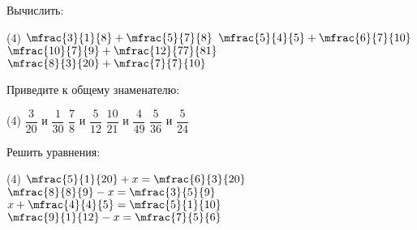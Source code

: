 %
%
%
%
%
%
%
%
\begin{class}[number=6]
	\begin{listofex}
		\item Вычислить:
		\begin{tasks}(4)
			\task \( \mfrac{3}{1}{8}+\mfrac{5}{7}{8} \)
			\task \( \mfrac{5}{4}{5}+\mfrac{6}{7}{10} \)
			\task \( \mfrac{10}{7}{9}+\mfrac{12}{77}{81} \)
			\task \( \mfrac{8}{3}{20}+\mfrac{7}{7}{10}\)
		\end{tasks}
		\item Приведите к общему знаменателю:
		\begin{tasks}(4)
			\task \( \dfrac{3}{20} \) и \( \dfrac{1}{30} \)
			\task \( \dfrac{7}{8} \) и \( \dfrac{5}{12} \)
			\task \( \dfrac{10}{21} \) и \( \dfrac{4}{49} \)
			\task \( \dfrac{5}{36} \) и \( \dfrac{5}{24} \)
		\end{tasks}
		\item Решить уравнения:
		\begin{tasks}(4)
			\task \( \mfrac{5}{1}{20}+x=\mfrac{6}{3}{20} \)
			\task \( \mfrac{8}{8}{9}-x=\mfrac{3}{5}{9} \)
			\task \( x+\mfrac{4}{4}{5}=\mfrac{5}{1}{10} \)
			\task \( \mfrac{9}{1}{12}-x=\mfrac{7}{5}{6} \)
		\end{tasks}
	\end{listofex}
\end{class}
